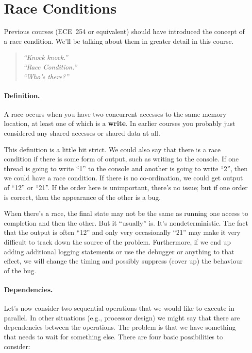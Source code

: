 





\section*{Race Conditions}
Previous courses (ECE~254 or equivalent) should have introduced the concept of a race condition. We'll be talking about them in greater detail in this course.

\begin{quote}
\textit{
	``Knock knock.''\\
	``Race Condition.''\\
	``Who's there?''
	}
\end{quote}

\paragraph{Definition.} A race occurs when you have two concurrent accesses to the
same memory location, at least one of which is a {\bf write}. In earlier courses you probably just considered any shared accesses or shared data at all. 

This definition is a little bit strict. We could also say that there is a race condition if there is some form of output, such as writing to the console. If one thread is going to write ``1'' to the console and another is going to write ``2'', then we could have a race condition. If there is no co-ordination, we could get output of ``12'' or ``21''. If the order here is unimportant, there's no issue; but if one order is correct, then the appearance of the other is a bug.

When there's a race, the final state may not be the same as running
one access to completion and then the other. But it ``usually'' is. It's nondeterministic. The fact that the output is often ``12'' and only very occasionally ``21'' may make it very difficult to track down the source of the problem. Furthermore, if we end up adding additional logging statements or use the debugger or anything to that effect, we will change the timing and possibly suppress (cover up) the behaviour of the bug.

\paragraph{Dependencies.}
Let's now consider two sequential operations that we would like to execute in parallel.
In other situations (e.g., processor design) we might say that there are dependencies between the operations. The problem is that we have something that needs to wait for something else. There are four basic possibilities to consider:

